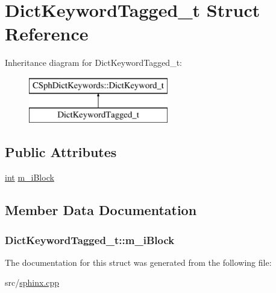 \hypertarget{structDictKeywordTagged__t}{\section{Dict\-Keyword\-Tagged\-\_\-t Struct Reference}
\label{structDictKeywordTagged__t}
}
Inheritance diagram for Dict\-Keyword\-Tagged\-\_\-t\-:\begin{figure}[H]
\begin{center}
\leavevmode
\includegraphics[height=2.000000cm]{structDictKeywordTagged__t}
\end{center}
\end{figure}
\subsection*{Public Attributes}
\begin{DoxyCompactItemize}
\item 
\hyperlink{sphinxexpr_8cpp_a4a26e8f9cb8b736e0c4cbf4d16de985e}{int} \hyperlink{structDictKeywordTagged__t_a2674c804a01b828b59c0cbb1cc75f668}{m\-\_\-i\-Block}
\end{DoxyCompactItemize}


\subsection{Member Data Documentation}
\hypertarget{structDictKeywordTagged__t_a2674c804a01b828b59c0cbb1cc75f668}{
\subsubsection[{m\-\_\-i\-Block}]{ Dict\-Keyword\-Tagged\-\_\-t\-::m\-\_\-i\-Block}}\label{structDictKeywordTagged__t_a2674c804a01b828b59c0cbb1cc75f668}


The documentation for this struct was generated from the following file\-:\begin{DoxyCompactItemize}
\item 
src/\hyperlink{sphinx_8cpp}{sphinx.\-cpp}\end{DoxyCompactItemize}
